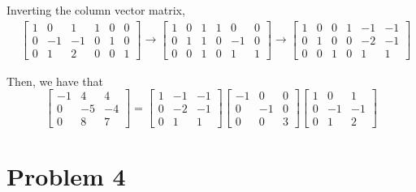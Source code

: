 \documentclass[12pt,letterpaper]{article}
\theoremstyle{definition}
\begin{document}
Inverting the column vector matrix,
\begin{align*}
  & \begin{bmatrix}
    1 & 0 & 1 & 1 & 0 & 0\\
    0 & -1 & -1 & 0 & 1 & 0\\
    0 & 1 & 2 & 0 & 0 & 1
  \end{bmatrix} \rightarrow
                        \begin{bmatrix}
                          1 & 0 & 1 & 1 & 0 & 0\\
                          0 & 1 & 1 & 0 & -1 & 0 \\
                          0 & 0 & 1 & 0 & 1 & 1
                        \end{bmatrix} \rightarrow 
                                              \begin{bmatrix}
                                                1 & 0 & 0 & 1 & -1 & -1\\
                                                0 & 1 & 0 & 0 & -2 & -1 \\
                                                0 & 0 & 1 & 0 & 1 & 1
                                              \end{bmatrix}
\end{align*}

Then, we have that
\[
  \begin{bmatrix}
    -1 & 4 & 4 \\
    0 & -5 & -4 \\
    0 & 8 & 7
  \end{bmatrix} =
  \begin{bmatrix}
    1 & -1 & -1\\
    0 & -2 & -1 \\
    0 & 1 & 1
  \end{bmatrix}
  \begin{bmatrix}
    -1 & 0 & 0\\
    0 & -1 & 0 \\
    0 & 0 & 3
  \end{bmatrix}
  \begin{bmatrix}
    1 & 0 & 1  \\
    0 & -1 & -1 \\
    0 & 1 & 2    
  \end{bmatrix}
\]

\section*{Problem 4}
\end{document}
